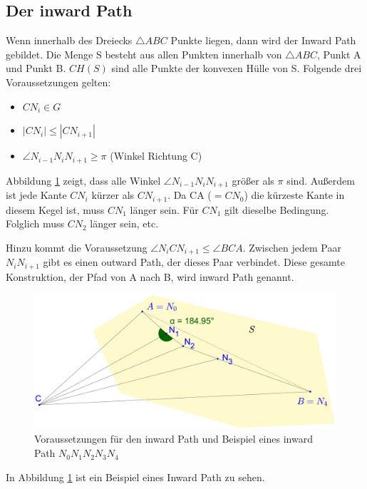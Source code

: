 \documentclass[a4paper,twoside]{IEEEtran}
\begin{document}
\subsection{Der inward Path}
Wenn innerhalb des Dreiecks $\triangle{ABC} $ Punkte liegen, dann wird der Inward Path gebildet.
Die Menge S besteht aus allen Punkten innerhalb von $\triangle {ABC} $, Punkt A und Punkt B.
$CH(S) $ sind alle Punkte der konvexen Hülle von S. %
Folgende drei Voraussetzungen gelten:

\begin{itemize} %
	\item $CN_i \in G$
	\item $|CN_i| \leq |CN_{i+1}| $
	\item $\angle{N_{i-1}N_iN_{i+1}} \geq \pi $ (Winkel Richtung C)
\end{itemize} 


Abbildung \ref{fig:inward_path_prop} zeigt, dass alle Winkel $\angle{N_{i-1}N_iN_{i+1}} $ größer als $\pi $ sind.
Außerdem ist jede Kante $CN_i $ kürzer als $CN_{i+1}$. 
Da CA ($= CN_0 $) die kürzeste Kante in diesem Kegel ist, muss $CN_1 $ länger sein. 
Für $CN_1 $ gilt dieselbe Bedingung. 
Folglich muss $CN_2 $ länger sein, etc.

Hinzu kommt die Voraussetzung $\angle{N_iCN_{i+1}} \leq \angle{BCA} $.
Zwischen jedem Paar $N_iN_{i+1} $ gibt es einen outward Path, der dieses Paar verbindet.
Diese gesamte Konstruktion, der Pfad von A nach B, wird inward Path genannt.

\begin{figure}[h!]
\centering
\includegraphics[width=1\linewidth]{inward_path_prop.eps}
\caption{Voraussetzungen für den inward Path und Beispiel eines inward Path $N_0N_1N_2N_3N_4 $}
\label{fig:inward_path_prop}
\end{figure}

In Abbildung \ref{fig:inward_path_prop} ist ein Beispiel eines Inward Path zu sehen.
\end{document}
